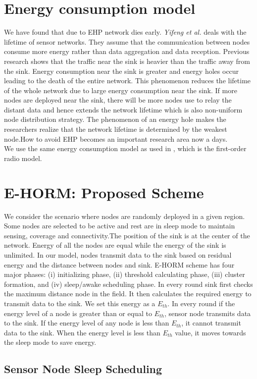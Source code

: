 \documentclass{article}
\begin{document}
\section{Energy consumption model}
\label{sec:typestyle}
We have found that due to EHP network dies early. \textit{Yifeng et al.} \cite{7} deals with the lifetime of sensor networks. They assume that the communication between nodes consume more energy rather than data aggregation and data reception. Previous research shows that the traffic near the sink is heavier than the traffic away from the sink. Energy consumption near the sink is greater and energy holes occur leading to the death of the entire network. This phenomenon reduces the lifetime of the whole network due to large energy consumption near the sink. If more nodes are deployed near the sink, there will be more nodes use to relay the distant data and hence extends the network lifetime which is also non-uniform node distribution strategy.
The phenomenon of an energy hole makes the researchers realize that the network lifetime is determined by the weakest node.How to avoid EHP becomes an important research area now a days.\\
We use the same energy consumption model as used in \cite{8}, which is the first-order radio model. \section{E-HORM: Proposed Scheme}
\label{sec:typestyle}
We consider the scenario where nodes are randomly deployed in a given region. Some nodes are selected to be active and rest are in sleep mode to maintain sensing, coverage and connectivity.The position of the sink is at the center of the network. Energy of all the nodes are equal while the energy of the sink is unlimited. In our model, nodes transmit data to the sink based on residual energy and the distance between nodes and sink.
E-HORM scheme has four major phases: (i) initializing phase, (ii) threshold calculating phase, (iii) cluster formation, and (iv) sleep/awake scheduling phase. In every round sink first checks the maximum distance node in the field. It then calculates the required energy to transmit data to the sink. We set this energy as a $E_{th}$. In every round if the energy level of a node is greater than or equal to $E_{th}$, sensor node transmits data to the sink. If the energy level of any node is less than $E_{th}$, it cannot transmit data to the sink. When the energy level is less than $E_{th}$ value, it moves towards the sleep mode to save energy. \subsection{Sensor Node Sleep Scheduling}
\end{document}
